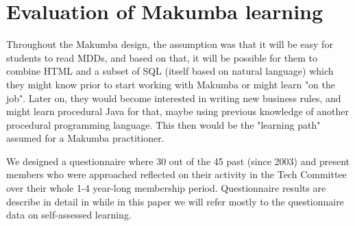 \documentclass{llncs}
\begin{document}
\section{Evaluation of Makumba learning}\label{sec:techCommittee}
Throughout the Makumba design, the assumption was that it will be easy for students to read MDDs, and based on that, it will be possible for them to combine HTML and a subset of SQL (itself based on natural language) which they might know prior to start working with Makumba or might learn "on the job". Later on, they would become interested in writing new business rules, and might learn procedural Java for that, maybe using previous knowledge of another procedural programming language. This then would be the "learning path" assumed for a Makumba practitioner.

We designed a questionnaire where 30 out of the 45 past (since 2003) and present members who were approached reflected on their activity in the Tech Committee over their whole 1-4 year-long membership period. Questionnaire results are describe in detail in \cite{bogdan_mayer09} while in this paper we will refer mostly to the questionnaire data on self-assessed learning.

\end{document}
